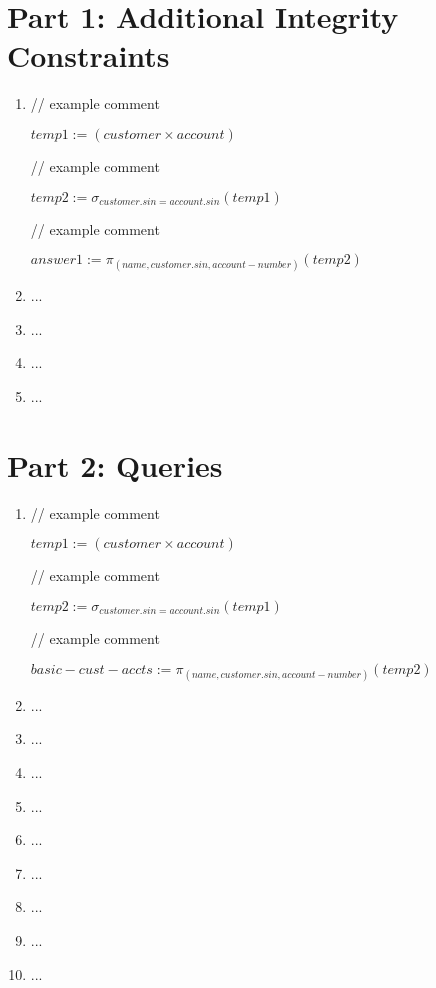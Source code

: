 \documentclass{article}
\begin{document}
\pagebreak
\section*{Part 1: Additional Integrity Constraints}

\begin{enumerate}
\item

// example comment

$temp1 := (customer \times account) $

// example comment

$temp2  := \sigma_{customer.sin = account.sin}(temp1)$

// example comment

$answer1 := \pi_{(name, customer.sin, account-number)}(temp2)$

\item ...

\item ...

\item ...

\item ...

\end{enumerate}

\pagebreak 
\section*{Part 2: Queries}

\begin{enumerate}

\item

// example comment

$temp1 := (customer \times account) $

// example comment

$temp2  := \sigma_{customer.sin = account.sin}(temp1)$

// example comment

$basic-cust-accts := \pi_{(name, customer.sin, account-number)}(temp2)$

\item ...

\item ...

\item ...

\item ...

\item ...

\item ...

\item ...

\item ...

\item ...

\end{enumerate}
\end{document}
